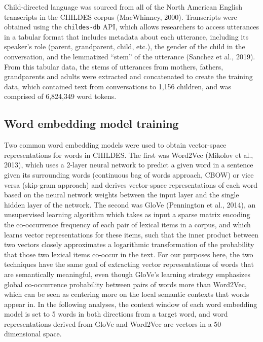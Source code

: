 \documentclass[10pt, letterpaper]{article}
\begin{document}
Child-directed language was sourced from all of the North American
English transcripts in the CHILDES corpus (MacWhinney, 2000).
Transcripts were obtained using the \texttt{childes-db} API, which
allows researchers to access utterances in a tabular format that
includes metadata about each utterance, including its speaker's role
(parent, grandparent, child, etc.), the gender of the child in the
conversation, and the lemmatized ``stem'' of the utterance (Sanchez et
al., 2019). From this tabular data, the stems of utterances from
mothers, fathers, grandparents and adults were extracted and
concatenated to create the training data, which contained text from
conversations to 1,156 children, and was comprised of 6,824,349 word
tokens.

\hypertarget{word-embedding-model-training}{%
\subsection{Word embedding model
training}\label{word-embedding-model-training}}

Two common word embedding models were used to obtain vector-space
representations for words in CHILDES. The first was Word2Vec (Mikolov et
al., 2013), which uses a 2-layer neural network to predict a given word
in a sentence given its surrounding words (continuous bag of words
approach, CBOW) or vice versa (skip-gram approach) and derives
vector-space representations of each word based on the neural network
weights between the input layer and the single hidden layer of the
network. The second was GloVe (Pennington et al., 2014), an unsupervised
learning algorithm which takes as input a sparse matrix encoding the
co-occurrence frequency of each pair of lexical items in a corpus, and
which learns vector representations for these items, such that the inner
product between two vectors closely approximates a logarithmic
transformation of the probability that those two lexical items co-occur
in the text. For our purposes here, the two techniques have the same
goal of extracting vector representations of words that are semantically
meaningful, even though GloVe's learning strategy emphasizes global
co-occurrence probability between pairs of words more than Word2Vec,
which can be seen as centering more on the local semantic contexts that
words appear in. In the following analyses, the context window of each
word embedding model is set to 5 words in both directions from a target
word, and word representations derived from GloVe and Word2Vec are
vectors in a 50-dimensional space.
\end{document}
